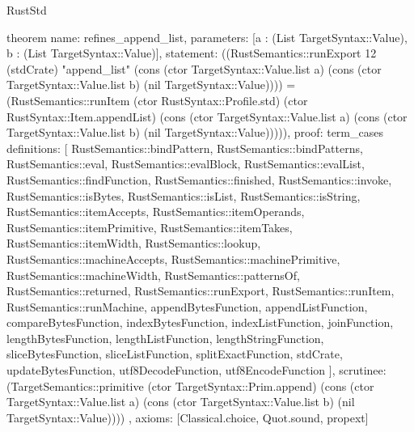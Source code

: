 \begin{lexlean}{RustStd}
\begin{semanticmodule}
theorem{
  name: refines_append_list,
  parameters: [a : (List TargetSyntax::Value), b : (List TargetSyntax::Value)],
  statement: ((RustSemantics::runExport 12 (stdCrate) "append_list" (cons (ctor TargetSyntax::Value.list a) (cons (ctor TargetSyntax::Value.list b) (nil TargetSyntax::Value)))) = (RustSemantics::runItem (ctor RustSyntax::Profile.std) (ctor RustSyntax::Item.appendList) (cons (ctor TargetSyntax::Value.list a) (cons (ctor TargetSyntax::Value.list b) (nil TargetSyntax::Value))))),
  proof: term_cases{
    definitions: [
      RustSemantics::bindPattern,
      RustSemantics::bindPatterns,
      RustSemantics::eval,
      RustSemantics::evalBlock,
      RustSemantics::evalList,
      RustSemantics::findFunction,
      RustSemantics::finished,
      RustSemantics::invoke,
      RustSemantics::isBytes,
      RustSemantics::isList,
      RustSemantics::isString,
      RustSemantics::itemAccepts,
      RustSemantics::itemOperands,
      RustSemantics::itemPrimitive,
      RustSemantics::itemTakes,
      RustSemantics::itemWidth,
      RustSemantics::lookup,
      RustSemantics::machineAccepts,
      RustSemantics::machinePrimitive,
      RustSemantics::machineWidth,
      RustSemantics::patternsOf,
      RustSemantics::returned,
      RustSemantics::runExport,
      RustSemantics::runItem,
      RustSemantics::runMachine,
      appendBytesFunction,
      appendListFunction,
      compareBytesFunction,
      indexBytesFunction,
      indexListFunction,
      joinFunction,
      lengthBytesFunction,
      lengthListFunction,
      lengthStringFunction,
      sliceBytesFunction,
      sliceListFunction,
      splitExactFunction,
      stdCrate,
      updateBytesFunction,
      utf8DecodeFunction,
      utf8EncodeFunction
    ],
    scrutinee: (TargetSemantics::primitive (ctor TargetSyntax::Prim.append) (cons (ctor TargetSyntax::Value.list a) (cons (ctor TargetSyntax::Value.list b) (nil TargetSyntax::Value))))
  },
  axioms: [Classical.choice, Quot.sound, propext]
}


\end{semanticmodule}
\end{lexlean}
